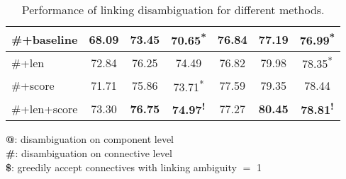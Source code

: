 \begin{table}[!htbp]
\begin{tabular}{|l|c|c|c|c|c|c|}
\hhline{|=|=|=|=|=|=|=|}

\#+baseline    &     68.09     &     73.45  &     70.65\textsuperscript{*} &     76.84     &     77.19  &     76.99\textsuperscript{*} \\ \hline
\#+len         &     72.84     &     76.25  &     74.49\textsuperscript{ } &     76.82     &     79.98  &     78.35\textsuperscript{*} \\ \hline
\#+score       &     71.71     &     75.86  &     73.71\textsuperscript{*} &     77.59     &     79.35  &     78.44\textsuperscript{ } \\ \hline
\#+len+score   &     73.30     & \bf 76.75  & \bf 74.97\textsuperscript{!} &     77.27     & \bf 80.45  & \bf 78.81\textsuperscript{!} \\ \hline

\end{tabular}
\begin{flushleft}
\small
\textbf{@}: disambiguation on component level \\
\textbf{\#}: disambiguation on connective level \\
\textbf{\$}: greedily accept connectives with linking ambiguity $=$ 1
\end{flushleft}
\caption{\label{t:linking-methods} Performance of linking
disambiguation for different methods. }
\end{table}

